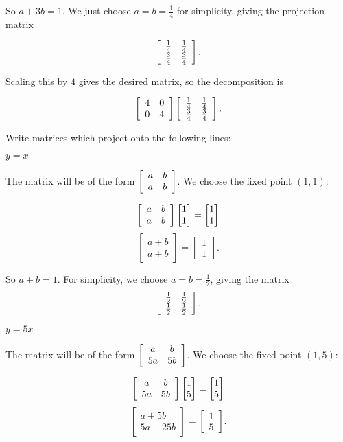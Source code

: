 \documentclass[../key.tex]{subfiles}
\begin{document}
So $a+3b = 1$. We just choose $a=b=\frac{1}{4}$ for simplicity, giving the projection matrix

$$\left[\begin{array}{cc} \frac{1}{4} & \frac{1}{4} \\ \frac{3}{4} & \frac{3}{4} \end{array}\right].$$

Scaling this by $4$ gives the desired matrix, so the decomposition is

$$\left[\begin{array}{cc} 4 & 0 \\ 0 & 4 \end{array}\right]\left[\begin{array}{cc} \frac{1}{4} & \frac{1}{4} \\ \frac{3}{4} & \frac{3}{4} \end{array}\right].$$

\begin{outer_problem}
\item Write matrices which project onto the following lines:
\end{outer_problem}

\begin{inner_problem}[start=1]
\item $y=x$
\end{inner_problem}

The matrix will be of the form $\left[\begin{array}{cc} a & b \\ a & b \end{array}\right]$. We choose the fixed point $(1,1)$:

$$\left[\begin{array}{cc} a & b \\ a & b \end{array}\right]\begin{bmatrix} 1 \\ 1 \end{bmatrix} = \begin{bmatrix} 1 \\ 1 \end{bmatrix}$$
$$\begin{bmatrix} a + b \\ a + b \end{bmatrix} = \begin{bmatrix} 1 \\ 1 \end{bmatrix}.$$

So $a+b=1$. For simplicity, we choose $a=b=\frac{1}{2}$, giving the matrix $$\left[\begin{array}{cc} \frac{1}{2} & \frac{1}{2} \\ \frac{1}{2} & \frac{1}{2} \end{array}\right].$$

\begin{inner_problem}
\item $y=5x$
\end{inner_problem}

The matrix will be of the form $\left[\begin{array}{cc} a & b \\ 5a & 5b \end{array}\right]$. We choose the fixed point $(1,5)$:

$$\left[\begin{array}{cc} a & b \\ 5a & 5b \end{array}\right]\begin{bmatrix} 1 \\ 5 \end{bmatrix} = \begin{bmatrix} 1 \\ 5 \end{bmatrix}$$
$$\begin{bmatrix} a + 5b \\ 5a + 25b \end{bmatrix} = \begin{bmatrix} 1 \\ 5 \end{bmatrix}.$$
\end{document}
